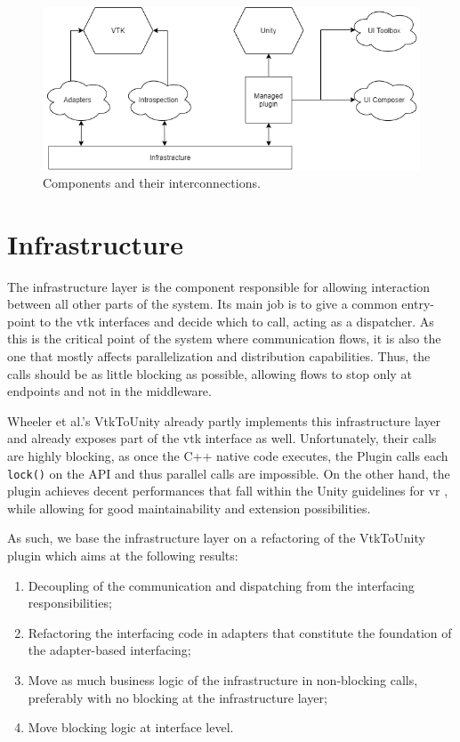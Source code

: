 \begin{figure}[t]
    \centering
    \includegraphics[width=\textwidth]{pictures/Architecture-high-level-transparent.png}
    \caption{Components and their interconnections.}
    \label{fig:high-level-architecture}
\end{figure}

\section{Infrastructure}
\label{sec:design-infrastructure}

The infrastructure layer is the component responsible for allowing interaction between all other parts of the system. Its main job is to give a common entry-point to the \acrshort{vtk} interfaces and decide which to call, acting as a dispatcher. As this is the critical point of the system where communication flows, it is also the one that mostly affects parallelization and distribution capabilities. Thus, the calls should be as little blocking as possible, allowing flows to stop only at endpoints and not in the middleware.

Wheeler et al.'s VtkToUnity \cite{wheeler_virtual_2018} already partly implements this infrastructure layer and already exposes part of the \acrshort{vtk} interface as well. Unfortunately, their calls are highly blocking, as once the C++ native code executes, the Plugin calls each \verb|lock()| on the API and thus parallel calls are impossible. On the other hand, the plugin achieves decent performances that fall within the Unity guidelines for \acrshort{vr} \cite{unity_vr_2020}, while allowing for good maintainability and extension possibilities.

As such, we base the infrastructure layer on a refactoring of the VtkToUnity plugin which aims at the following results:

\begin{enumerate}
    \item Decoupling of the communication and dispatching from the interfacing responsibilities;
    \item Refactoring the interfacing code in adapters that constitute the foundation of the adapter-based interfacing;
    \item Move as much business logic of the infrastructure in non-blocking calls, preferably with no blocking at the infrastructure layer;
    \item Move blocking logic at interface level.
\end{enumerate}

